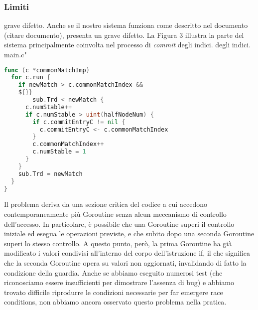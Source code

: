 \subsubsection{Limiti}
grave difetto. 
Anche se il nostro sistema funziona come descritto nel documento (citare documento), presenta un 
grave difetto. 
La Figura 3 illustra la parte del sistema principalmente coinvolta nel processo di \textit{commit} 
degli indici.
degli indici.
main.c"
\begin{lstlisting}[language=Go]
func (c *commonMatchImp) 
  for c.run { 
    if newMatch > c.commonMatchIndex && 
    ${}}
        sub.Trd < newMatch { 
      c.numStable++ 
      if c.numStable > uint(halfNodeNum) {
        if c.commitEntryC != nil {
          c.commitEntryC <- c.commonMatchIndex
        } 
        c.commonMatchIndex++
        c.numStable = 1
      } 
    } 
    sub.Trd = newMatch
  } 
}
\end{lstlisting}
Il problema deriva da una sezione critica del codice a cui accedono contemporaneamente più 
Goroutine senza alcun meccanismo di controllo dell'accesso. In particolare, è possibile che una Goroutine 
superi il controllo iniziale ed esegua le operazioni previste, e che subito dopo una seconda 
Goroutine superi lo stesso controllo. A questo punto, però, la prima Goroutine ha già modificato i 
valori condivisi all'interno del corpo dell'istruzione if, il che significa che la seconda Goroutine 
opera su valori non aggiornati, invalidando di fatto la condizione della guardia. Anche se abbiamo 
eseguito numerosi test (che riconosciamo essere insufficienti per dimostrare l'assenza di bug) e 
abbiamo trovato difficile riprodurre le condizioni necessarie per far emergere race conditions,
non abbiamo ancora osservato questo problema nella pratica.
